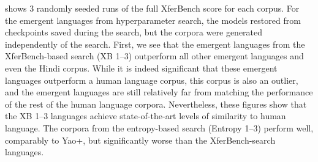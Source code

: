  shows $3$ randomly seeded runs of the full XferBench score for each corpus.
For the emergent languages from hyperparameter search, the models restored from checkpoints saved during the search, but the corpora were generated independently of the search.
First, we see that the emergent languages from the XferBench-based search (XB 1--3) outperform all other emergent languages and even the Hindi corpus.
While it is indeed significant that these emergent languages outperform a human language corpus, this corpus is also an outlier, and the emergent languages are still relatively far from matching the performance of the rest of the human language corpora.
Nevertheless, these figures show that the XB 1--3 languages achieve state-of-the-art levels of similarity to human language.
The corpora from the entropy-based search (Entropy 1--3) perform well, comparably to Yao+, but significantly worse than the XferBench-search languages.

